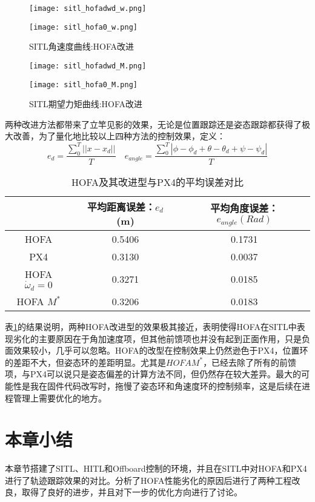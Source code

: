 \begin{figure}[H]
  \centering
\begin{minipage}[b]{0.49\linewidth}
    \texttt{[image: sitl\_hofadwd\_w.png]}
    \caption*{$\dot \omega_d =0$}
\end{minipage}
\hfill
\begin{minipage}[b]{0.49\linewidth}
    \texttt{[image: sitl\_hofa0\_w.png]}
    \caption*{$M^*$}
\end{minipage}
\caption{SITL角速度曲线:HOFA改进}
\end{figure}


\begin{figure}[H]
  \centering
\begin{minipage}[b]{0.49\linewidth}
    \texttt{[image: sitl\_hofadwd\_M.png]}
    \caption*{$\dot \omega_d =0$}
\end{minipage}
\hfill
\begin{minipage}[b]{0.49\linewidth}
    \texttt{[image: sitl\_hofa0\_M.png]}
    \caption*{$M^*$}
\end{minipage}
\caption{SITL期望力矩曲线:HOFA改进}
\end{figure}

两种改进方法都带来了立竿见影的效果，无论是位置跟踪还是姿态跟踪都获得了极大改善，为了量化地比较以上四种方法的控制效果，定义：
$$e_d=\frac{\sum_0^{T}||x-x_d||}{T} \quad e_{angle}=\frac{\sum_0^{T}|\phi-\phi_d+\theta-\theta_d+\psi-\psi_d|}{T}$$

\begin{table}[H]
  \centering
  \caption{HOFA及其改进型与PX4的平均误差对比}
  \label{HOFA改}
  \begin{tabular}{ccc}
      \toprule
      & 平均距离误差：$e_d$ (m)& 平均角度误差：$e_{angle}(Rad)$  \\
      \midrule
      HOFA &0.5406  & 0.1731\\
      PX4 & 0.3130 &  0.0037\\
      HOFA $\dot \omega_d=0$ & 0.3271 & 0.0185\\
      HOFA $M^*$ &0.3206  & 0.0183\\
      \bottomrule
  \end{tabular}
\end{table}
表\ref{HOFA改}的结果说明，两种HOFA改进型的效果极其接近，表明使得HOFA在SITL中表现劣化的主要原因在于角加速度项，但其他前馈项也并没有起到正面作用，只是负面效果较小，几乎可以忽略。HOFA的改型在控制效果上仍然逊色于PX4，位置环的差距不大，但姿态环的差距明显。尤其是$HOFA M^*$，已经去除了所有的前馈项，与PX4可以说只是姿态偏差的计算方法不同，但仍然存在较大差异。最大的可能性是我在固件代码改写时，拖慢了姿态环和角速度环的控制频率，这是后续在进程管理上需要优化的地方。
\newpage

\section{本章小结}
本章节搭建了SITL、HITL和Offboard控制的环境，并且在SITL中对HOFA和PX4进行了轨迹跟踪效果的对比。分析了HOFA性能劣化的原因后进行了两种工程改良，取得了良好的进步，并且对下一步的优化方向进行了讨论。